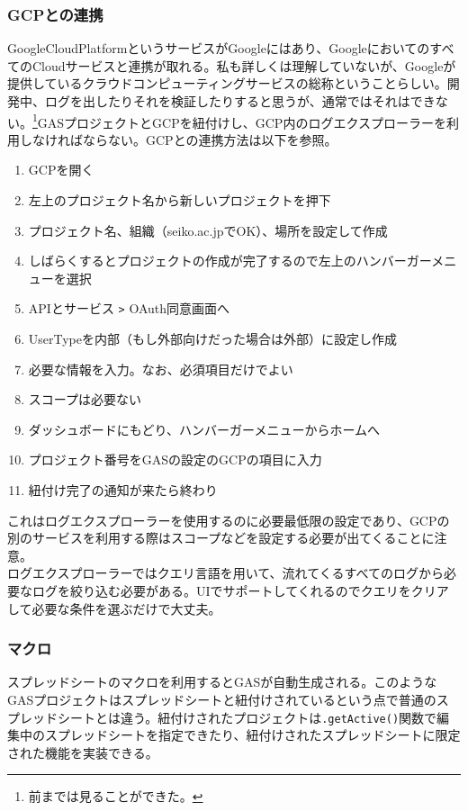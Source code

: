 \documentclass[a4paper]{ltjsreport}
\newcommand{\terlogy}[2][|]{\colorbox{terlogy}{\texttt{\lstinline#1#2#1}}}
\begin{document}
\subsubsection{GCPとの連携}
GoogleCloudPlatformというサービスがGoogleにはあり、GoogleにおいてのすべてのCloudサービスと連携が取れる。私も詳しくは理解していないが、Googleが提供しているクラウドコンピューティングサービスの総称ということらしい。開発中、ログを出したりそれを検証したりすると思うが、通常ではそれはできない。\footnote{前までは見ることができた。}GASプロジェクトとGCPを紐付けし、GCP内のログエクスプローラーを利用しなければならない。GCPとの連携方法は以下を参照。
\begin{enumerate}
  \item GCPを開く
  \item 左上のプロジェクト名から新しいプロジェクトを押下
  \item プロジェクト名、組織（seiko.ac.jpでOK）、場所を設定して作成
  \item しばらくするとプロジェクトの作成が完了するので左上のハンバーガーメニューを選択
  \item APIとサービス \verb|>| OAuth同意画面へ
  \item UserTypeを内部（もし外部向けだった場合は外部）に設定し作成
  \item 必要な情報を入力。なお、必須項目だけでよい
  \item スコープは必要ない
  \item ダッシュボードにもどり、ハンバーガーメニューからホームへ
  \item プロジェクト番号をGASの設定のGCPの項目に入力
  \item 紐付け完了の通知が来たら終わり
\end{enumerate}
これはログエクスプローラーを使用するのに必要最低限の設定であり、GCPの別のサービスを利用する際はスコープなどを設定する必要が出てくることに注意。
\\

ログエクスプローラーではクエリ言語を用いて、流れてくるすべてのログから必要なログを絞り込む必要がある。UIでサポートしてくれるのでクエリをクリアして必要な条件を選ぶだけで大丈夫。
\subsubsection{マクロ}
スプレッドシートのマクロを利用するとGASが自動生成される。このようなGASプロジェクトはスプレッドシートと紐付けされているという点で普通のスプレッドシートとは違う。紐付けされたプロジェクトは\terlogy{.getActive()}関数で編集中のスプレッドシートを指定できたり、紐付けされたスプレッドシートに限定された機能を実装できる。
\\
\end{document}
